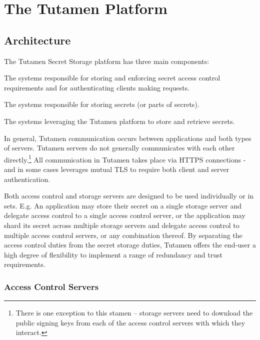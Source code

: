 \section{The Tutamen Platform}
\label{sec:tutamen}

\subsection{Architecture}

The Tutamen Secret Storage platform has three main components:

\begin{packed_desc}
\item[Access Control Servers (ACS):] The systems responsible for
  storing and enforcing secret access control requirements and for
  authenticating clients making requests.
\item[Storage Servers (SS):] The systems responsible for storing
  secrets (or parts of secrets).
\item[Applications:] The systems leveraging the Tutamen platform to
  store and retrieve secrets.
\end{packed_desc}

In general, Tutamen communication occurs between applications and both
types of servers. Tutamen servers do not generally communicates with
each other directly.\footnote{There is one exception to this stamen --
  storage servers need to download the public signing keys from each
  of the access control servers with which they interact.} All
communication in Tutamen takes place via HTTPS connections - and in
some cases leverages mutual TLS to require both client and server
authentication.

Both access control and storage servers are designed to be used
individually or in sets. E.g. An application may store their secret
on a single storage server and delegate access control to a single
access control server, or the application may shard its secret across
multiple storage servers and delegate access control to multiple
access control servers, or any combination thereof. By separating the
access control duties from the secret storage duties, Tutamen offers
the end-user a high degree of flexibility to implement a range of
redundancy and trust requirements.

\subsubsection{Access Control Servers}

